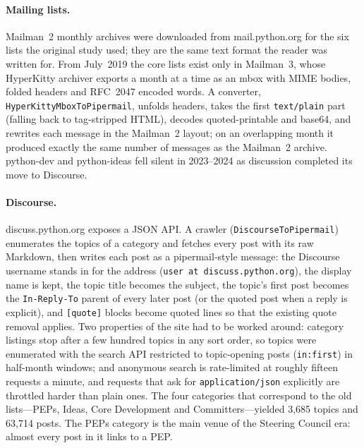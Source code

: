 \paragraph{Mailing lists.} Mailman~2 monthly archives were downloaded from mail.python.org for the six lists the original study used; they are the same text format the reader was written for. From July~2019 the core lists exist only in Mailman~3, whose HyperKitty archiver exports a month at a time as an mbox with MIME bodies, folded headers and RFC~2047 encoded words. A converter, \texttt{HyperKittyMbox\allowbreak ToPipermail}, unfolds headers, takes the first \texttt{text/plain} part (falling back to tag-stripped HTML), decodes quoted-printable and base64, and rewrites each message in the Mailman~2 layout; on an overlapping month it produced exactly the same number of messages as the Mailman~2 archive. python-dev and python-ideas fell silent in 2023--2024 as discussion completed its move to Discourse.

\paragraph{Discourse.} discuss.python.org exposes a JSON API. A crawler (\texttt{DiscourseToPipermail}) enumerates the topics of a category and fetches every post with its raw Markdown, then writes each post as a pipermail-style message: the Discourse username stands in for the address (\texttt{user at discuss.python.org}), the display name is kept, the topic title becomes the subject, the topic's first post becomes the \texttt{In-Reply-To} parent of every later post (or the quoted post when a reply is explicit), and \texttt{[quote]} blocks become quoted lines so that the existing quote removal applies. Two properties of the site had to be worked around: category listings stop after a few hundred topics in any sort order, so topics were enumerated with the search API restricted to topic-opening posts (\texttt{in:first}) in half-month windows; and anonymous search is rate-limited at roughly fifteen requests a minute, and requests that ask for \texttt{application/json} explicitly are throttled harder than plain ones. The four categories that correspond to the old lists---PEPs, Ideas, Core Development and Committers---yielded 3,685 topics and 63,714 posts. The PEPs category is the main venue of the Steering Council era: almost every post in it links to a PEP.

